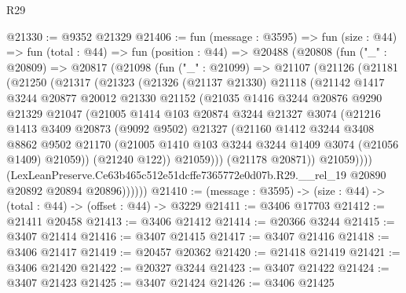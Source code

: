\begin{lexlean}{R29}
\begin{coremodule}
@21330 := @9352 @21329
@21406 := fun (message : @3595) =>
  fun (size : @44) =>
  fun (total : @44) =>
  fun (position : @44) =>
  @20488
    (@20808
      (fun ("_" : @20809) =>
      @20817
        (@21098
          (fun ("_" : @21099) =>
          @21107
            (@21126
              (@21181
                (@21250
                  (@21317
                    (@21323
                      (@21326
                        (@21137 @21330)
                        @21118
                        (@21142
                          @1417
                          @3244
                          @20877
                          @20012
                          @21330
                          @21152
                          (@21035
                            @1416
                            @3244
                            @20876
                            @9290
                            @21329
                            @21047
                            (@21005
                              @1414
                              @103
                              @20874
                              @3244
                              @21327
                              @3074
                              (@21216
                                @1413
                                @3409
                                @20873
                                (@9092 @9502)
                                @21327
                                (@21160
                                  @1412
                                  @3244
                                  @3408
                                  @8862
                                  @9502
                                  @21170
                                  (@21005 @1410 @103 @3244 @3244 @1409 @3074 (@21056 @1409) @21059))
                                (@21240 @122))
                              @21059)))
                        (@21178 @20871))
                      @21059))))
              (LexLeanPreserve.Ce63b465c512e51dcffe7365772e0d07b.R29.__rel_19
                @20890
                @20892
                @20894
                @20896))))))
@21410 := (message : @3595) -> (size : @44) -> (total : @44) -> (offset : @44) -> @3229
@21411 := @3406 @17703
@21412 := @21411 @20458
@21413 := @3406 @21412
@21414 := @20366 @3244
@21415 := @3407 @21414
@21416 := @3407 @21415
@21417 := @3407 @21416
@21418 := @3406 @21417
@21419 := @20457 @20362
@21420 := @21418 @21419
@21421 := @3406 @21420
@21422 := @20327 @3244
@21423 := @3407 @21422
@21424 := @3407 @21423
@21425 := @3407 @21424
@21426 := @3406 @21425

\end{coremodule}
\end{lexlean}
